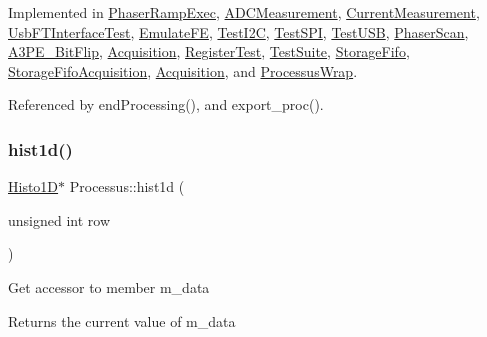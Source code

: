 Implemented in \hyperlink{classPhaserRampExec_a8849cacdd34e7ca56f6d5e7668fe8c6c}{Phaser\+Ramp\+Exec}, \hyperlink{classADCMeasurement_a02a5ae7c0f9c90d0dad00c1d40a1c52a}{A\+D\+C\+Measurement}, \hyperlink{classCurrentMeasurement_af87fa329a11212c10e878568bcecaeb3}{Current\+Measurement}, \hyperlink{classUsbFTInterfaceTest_a652987fb86a0605842d9a8d7726b8012}{Usb\+F\+T\+Interface\+Test}, \hyperlink{classEmulateFE_a7d29ee79a606d0f7d337b1e78ef54a03}{Emulate\+FE}, \hyperlink{classTestI2C_af7f36cd1607eb089a6de1bee57c388e7}{Test\+I2C}, \hyperlink{classTestSPI_aa07f9e513271f933a9166226505779b0}{Test\+S\+PI}, \hyperlink{classTestUSB_a24bb22d7203746e6c3b5669aa71e72f3}{Test\+U\+SB}, \hyperlink{classPhaserScan_a505bd8dc2961fd220f1624cd949a266e}{Phaser\+Scan}, \hyperlink{classA3PE__BitFlip_ab40772a001613a0e1932d1e356ccf717}{A3\+P\+E\+\_\+\+Bit\+Flip}, \hyperlink{classAcquisition_ab8ffcd86548280f0403b3ae6338f2499}{Acquisition}, \hyperlink{classRegisterTest_a6d37b30d3e663c99f7deef01310bea76}{Register\+Test}, \hyperlink{classTestSuite_a3a1658a78902d96e00c888c17862abdb}{Test\+Suite}, \hyperlink{classStorageFifo_aaa04959087ffc774dbb713f9910c6c04}{Storage\+Fifo}, \hyperlink{classStorageFifoAcquisition_acb6eee350941bc44e2a4cb768b359d4f}{Storage\+Fifo\+Acquisition}, \hyperlink{classAcquisition_a92b4b55e8c7d53610e7eda6d5b9c74a4}{Acquisition}, and \hyperlink{structProcessusWrap_a6be9ef2aaa45c23bc780d264875cc542}{Processus\+Wrap}.



Referenced by end\+Processing(), and export\+\_\+proc().

\mbox{\label{classProcessus_a409227db936baff03c0462c1bcfe8069}} 
\subsubsection{\texorpdfstring{hist1d()}{hist1d()}}
{\footnotesize\ttfamily \hyperlink{classHisto1D}{Histo1D}$\ast$ Processus\+::hist1d (\begin{DoxyParamCaption}\item[{unsigned int}]{row }\end{DoxyParamCaption})\hspace{0.3cm}{\ttfamily [inline]}}

Get accessor to member m\+\_\+data \begin{DoxyReturn}{Returns}
the current value of m\+\_\+data 
\end{DoxyReturn}


